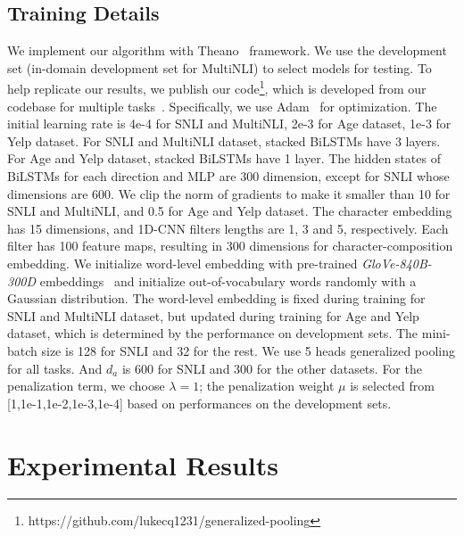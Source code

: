 \documentclass[11pt]{article}
\begin{document}
\subsection{Training Details} 
We implement our algorithm with Theano~\cite{2016arXiv160502688short} framework.
We use the development set (in-domain development set for MultiNLI) to select models for testing. To help replicate our results, we publish our code\footnote{https://github.com/lukecq1231/generalized-pooling}, which is developed from our codebase for multiple tasks~\cite{DBLP:conf/acl/ChenZLIW18,DBLP:conf/acl/ChenZLWJI17,DBLP:conf/ijcai/ChenZLWJ16,Zhang:qa:2017}. Specifically, we use Adam~\cite{DBLP:journals/corr/KingmaB14} for optimization. The initial learning rate is 4e-4 for SNLI and MultiNLI, 2e-3 for Age dataset, 1e-3 for Yelp dataset. For SNLI and MultiNLI dataset, stacked BiLSTMs have 3 layers. For Age and Yelp dataset, stacked BiLSTMs have 1 layer. The hidden states of BiLSTMs for each direction and MLP are 300 dimension, except for SNLI whose dimensions are 600. We clip the norm of gradients to make it smaller than 10 for SNLI and MultiNLI, and 0.5 for Age and Yelp dataset. The character embedding has 15 dimensions, and 1D-CNN filters lengths are 1, 3 and 5, respectively. Each filter has 100 feature maps, resulting in 300 dimensions for character-composition embedding. We initialize word-level embedding with pre-trained \textit{GloVe-840B-300D} embeddings~\cite{DBLP:conf/emnlp/PenningtonSM14} and initialize out-of-vocabulary words randomly with a Gaussian distribution. The word-level embedding is fixed during training for SNLI and MultiNLI dataset, but updated during training for Age and Yelp dataset, which is determined by the performance on development sets. 
The mini-batch size is 128 for SNLI and 32 for the rest. We use 5 heads generalized pooling for all tasks. And $d_a$ is 600 for SNLI and 300 for the other datasets. For the penalization term, we choose $\lambda = 1$; the penalization weight $\mu$ is selected from [1,1e-1,1e-2,1e-3,1e-4] based on performances on the development sets.

\section{Experimental Results}
\end{document}
